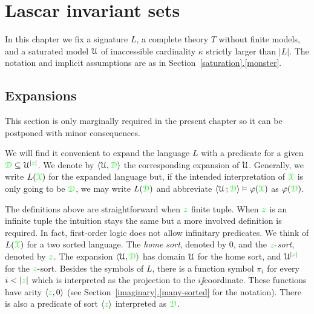 \documentclass[creche.tex]{subfiles}
\begin{document}
\chapter{Lascar invariant sets}
\label{invariantL}

\def\medrel#1{\parbox[t]{6ex}{$\displaystyle\hfil #1$}}
\def\ceq#1#2#3{\parbox[t]{18ex}{$\displaystyle #1$}\medrel{#2}{$\displaystyle #3$}}

\def\mr{\color{brown}}
\def\gr{\color{green}}

In this chapter we fix a signature $L$, a complete theory $T$ without finite models, and a saturated model $\EuScript U$ of inaccessible cardinality $\kappa$ strictly larger than $|L|$.
The notation and implicit assumptions are as in Section~\hyperref[monster]{\ref*{saturation}.\ref*{monster}}.

\section{Expansions}
\label{expansions}

\def\ceq#1#2#3{\parbox[t]{16ex}{$\displaystyle #1$}\medrel{#2}{$\displaystyle #3$}}

This section is only marginally required in the present chapter so it can be postponed with minor consequences.

We will find it convenient to expand the language $L$ with a predicate for a given $\grD\subseteq\U^{|{\gr z}|}$. We denote by $\<\U,\grD\>$ the corresponding expansion of $\EuScript U$. Generally, we write \emph{$L({\gr\X})$} for the expanded language but, if the intended interpretation of ${\gr\X}$ is only going to be $\grD$, we may write \emph{$L(\grD)$} and abbreviate $\<\U\,;\grD\>\models\phi({\gr\X})$ as $\phi(\grD)$. 



\begin{remark}
The definitions above are straightforward when ${\gr z}$ finite tuple. When ${\gr z}$ is an infinite tuple the intuition stays the same but a more involved definition is required. In fact, first-order logic does not allow infinitary predicates. We think of $L({\gr\X})$ for a two sorted language. The \textit{home sort}, denoted by $0$, and the ${\gr z}\jj$\textit{sort}, denoted by ${\gr z}$. The expansion $\<\U,\grD\>$ has domain $\EuScript U$ for the home sort, and $\U^{|{\gr z}|}$ for the ${\gr z}\jj$sort. Besides the symbols of $L$, there is a function symbol $\pi_i$ for every $i<|{\gr z}|$ which is interpreted as the projection to the $i\jj$coordinate. These functions have arity $\<{\gr z},0\>$ (see Section~\hyperref[many-sorted]{\ref*{imaginary}.\ref*{many-sorted}} for the notation). There is also a predicate of sort $\<{\gr z}\>$ interpreted as $\grD$.\QED
\end{remark}
\end{document}
